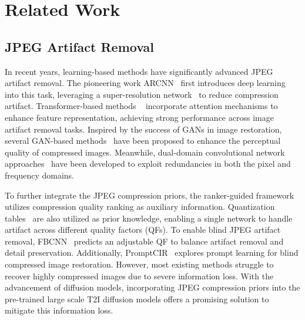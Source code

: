 \section{Related Work}
\vspace{-1mm}
\subsection{JPEG Artifact Removal}
\vspace{-1mm}
In recent years, learning-based methods have significantly advanced JPEG artifact removal. The pioneering work ARCNN~\cite{dong2015compression} first introduces deep learning into this task, leveraging a super-resolution network~\cite{dong2014learning} to reduce compression artifact. Transformer-based methods ~\cite{zhang2019residual,liang2021swinir} incorporate attention mechanisms to enhance feature representation, achieving strong performance across image artifact removal tasks. Inspired by the success of GANs in image restoration, several GAN-based methods~\cite{galteri2017deep,galteri2019deep} have been proposed to enhance the perceptual quality of compressed images. Meanwhile, dual-domain convolutional network approaches~\cite{guo2016building,kim2020agarnet,zhang2018dmcnn,zheng2019implicit,han2024jdec} have been developed to exploit redundancies in both the pixel and frequency domains. 

To further integrate the JPEG compression priors, the ranker-guided framework~\cite{wang2021jpeg} utilizes compression quality ranking as auxiliary information.
Quantization tables~\cite{li2020learning,ehrlich2020quantization} are also utilized as prior knowledge, enabling a single network to handle artifact across different quality factors (QFs). To enable blind JPEG artifact removal, FBCNN~\cite{jiang2021towards} predicts an adjustable QF to balance artifact removal and detail preservation. Additionally, PromptCIR~\cite{li2024promptcir} explores prompt learning for blind compressed image restoration. However, most existing methods struggle to recover highly compressed images due to severe information loss. With the advancement of diffusion models, incorporating JPEG compression priors into the pre-trained large scale T2I diffusion models offers a promising solution to mitigate this information loss. 

